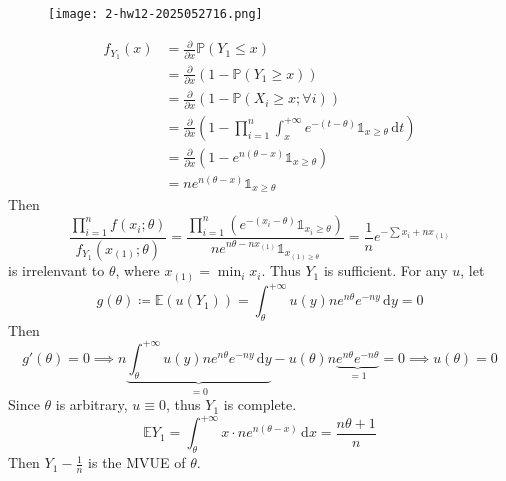 \begin{exercise}
\begin{figure}[H]
\centering
\texttt{[image: 2-hw12-2025052716.png]}
\label{}
\end{figure}
\end{exercise}
\[
\begin{aligned}
f_{Y_1}(x) & =\frac{ \partial   }{ \partial x } \mathbb{P}(Y_1\leq x) \\
 & =\frac{ \partial   }{ \partial x } (1-\mathbb{P}(Y_1\geq x)) \\
 & =\frac{ \partial   }{ \partial x } (1-\mathbb{P}(X_i\geq x;\forall i)) \\
 & =\frac{ \partial   }{ \partial x } \left( 1-\prod_{i=1}^{n} \int_{x}^{+\infty} e^{ -(t-\theta) }\mathbb{1}_{x\geq \theta} \, \mathrm{d}t  \right) \\
 & =\frac{ \partial   }{ \partial x } (1-e^{ n(\theta-x) }\mathbb{1}_{x\geq \theta}) \\
 & =ne^{ n(\theta-x) }\mathbb{1}_{x\geq \theta}
\end{aligned}
\]
Then
\[
\frac{\prod_{i=1}^{n} f(x_i;\theta)}{f_{Y_1}(x_{(1)};\theta)}=\frac{\prod_{i=1}^{n} (e^{ -(x_i-\theta) }\mathbb{1}_{x_i\geq \theta})}{ne^{ n\theta -nx_{(1)}}\mathbb{1}_{x_{(1)\geq \theta}}}=\frac{1}{n}e^{ -\sum x_i +nx_{(1)}}
\]
is irrelenvant to $\theta$, where $x_{(1)}=\min_{i}x_i$. Thus $Y_1$ is sufficient. For any $u$, let
\[
g(\theta)\coloneqq \mathbb{E}(u(Y_1))=\int_{\theta}^{+\infty} u(y)ne^{ n\theta }e^{ -ny } \, \mathrm{d}y=0
\]
Then
\[
g'(\theta)=0\implies n\underbrace{ \int_{\theta}^{+\infty} u(y)ne^{ n\theta }e^{ -ny } \, \mathrm{d}y }_{ =0 } -u(\theta)n\underbrace{ e^{ n\theta }e^{ -n\theta } }_{ =1 }=0\implies u(\theta)=0
\]
Since $\theta$ is arbitrary, $u\equiv0$, thus $Y_1$ is complete.
\[
\mathbb{E}Y_1=\int_{\theta}^{+\infty} x\cdot ne^{ n(\theta-x) } \, \mathrm{d}x =\frac{n\theta  +1}{n}
\]
Then $Y_1-\frac{1}{n}$ is the MVUE of $\theta$.


